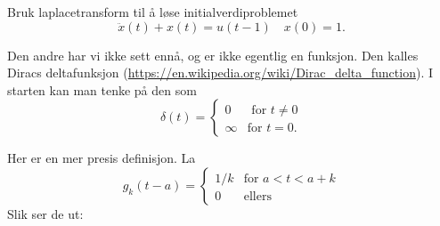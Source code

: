 \documentclass[a4paper,norsk,11pt]{interaktiv}
\begin{document}
\begin{oppgave}{6}
Bruk laplacetransform til å løse initialverdiproblemet
\[
\ddot{x}(t)+x(t)=u(t-1) \quad x(0)=1.
\]
\end{oppgave}

Den andre har vi ikke sett ennå, 
og er ikke egentlig en funksjon. 
Den kalles Diracs deltafunksjon (\url{https://en.wikipedia.org/wiki/Dirac_delta_function}).
I starten kan man tenke på den som 
\[
\delta(t)= \left\{ 
\begin{array}{ll}
0 & \mbox{ for } t\neq 0\\
\infty & \mbox{for } t= 0.
\end{array}
\right.
\]

Her er en mer presis definisjon. La 
\begin{equation*}
g_k(t-a)=    
\begin{cases}
      1/k  & \text{for } a < t < a + k \\
      0 & \text{ellers} 
    \end{cases} 
\end{equation*}
Slik ser de ut:
 \begin{center}
  \end{center}
\end{document}
